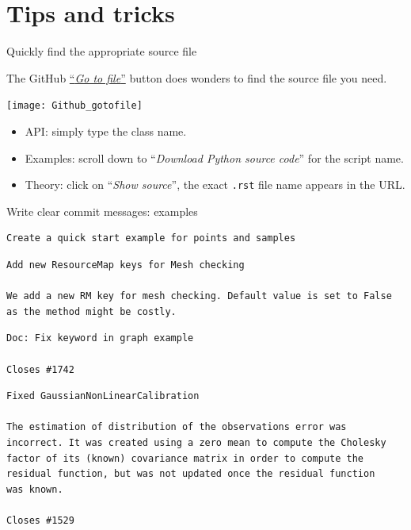 \documentclass[8pt]{beamer}
\begin{document}
\section{Tips and tricks}



\begin{frame}{Quickly find the appropriate source file}

The GitHub \href{https://github.com/openturns/openturns/find/master}{``\alert{\emph{Go to file}}''} button does wonders to find the source file you need.

\texttt{[image: Github\_gotofile]}

\begin{itemize}
    \item API: simply type the class name.
    \item Examples: scroll down to ``\alert{\emph{Download Python source code}}'' for the script name.
    \item Theory: click on ``\alert{\emph{Show source}}'', the exact \texttt{.rst} file name appears in the URL.
\end{itemize}

\end{frame}


\begin{frame}[fragile]{Write clear commit messages: examples}

\lstset{style=mystyle}

\begin{lstlisting}
Create a quick start example for points and samples
\end{lstlisting}

\begin{lstlisting}
Add new ResourceMap keys for Mesh checking

We add a new RM key for mesh checking. Default value is set to False
as the method might be costly.
\end{lstlisting}

\begin{lstlisting}
Doc: Fix keyword in graph example

Closes #1742
\end{lstlisting}

\begin{lstlisting}
Fixed GaussianNonLinearCalibration

The estimation of distribution of the observations error was
incorrect. It was created using a zero mean to compute the Cholesky
factor of its (known) covariance matrix in order to compute the
residual function, but was not updated once the residual function
was known.

Closes #1529
\end{lstlisting}

\end{frame}
\end{document}
